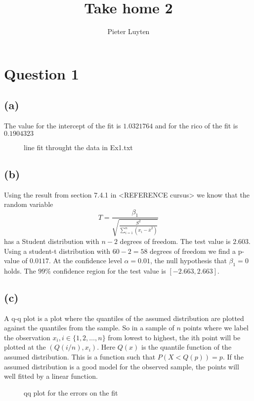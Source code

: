\documentclass[a4paper]{article}
\title{Take home 2}
\author{Pieter Luyten}
\begin{document}
\maketitle

\section*{Question 1}
\subsection*{(a)}
The value for the intercept of the fit is $1.0321764$ and for the rico of the fit is $0.1904323$
\begin{figure}[h]
	\centering
	
	\caption{line fit throught the data in Ex1.txt}
	\label{fig:fit-1a}
\end{figure}

\subsection*{(b)}
Using the result from section 7.4.1 in <REFERENCE cursus> we know that the random variable
\begin{equation}
	T = \frac{\beta_1}{\sqrt{ \frac{S^2}{ \sum_{i=1}^{n}(x_i-\bar{x}^2)}}}
\end{equation}
has a Student distribution with $n-2$ degrees of freedom. The test value is $2.603$. Using a student-t distribution with $60-2=58$ degrees of freedom we find a p-value of $0.0117$. At the confidence level $\alpha=0.01$, the null hypothesis that $\beta_1=0$ holds. The $99\%$ confidence region for the test value is $[-2.663, 2.663]$.

\subsection*{(c)}
A q-q plot is a plot where the quantiles of the assumed distribution are plotted against the quantiles from the sample. So in a sample of $n$ points where we label the observation $x_i, i \in \{1,2, \ldots, n\}$ from lowest to highest, the ith point will be plotted at the $(Q(i/n), x_i)$. 
Here $Q(x)$ is the quantile function of the assumed distribution. This is a function such that $ P( X < Q(p)) = p$. If the assumed distribution is a good model for the observed sample, the points will well fitted by a linear function.

\begin{figure}[h]
	\centering
	
	\caption{qq plot for the errors on the fit}
	\label{fig:qqplot-1c}
\end{figure}

\end{document}
